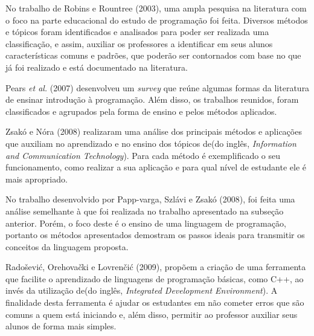 \nocite{doi:10.1076/csed.13.2.137.14200} 
No trabalho de Robins e Rountree (2003), uma ampla pesquisa na literatura com o foco na parte educacional do estudo de programação foi feita. Diversos métodos e tópicos foram identificados e analisados para poder ser realizada uma classificação, e assim, auxiliar os professores a identificar em seus alunos características comuns e padrões, que poderão ser contornados com base no que já foi realizado e está documentado na literatura.

\nocite{Pears:2007:SLT:1345443.1345441}
Pears \textit{et al.} (2007) desenvolveu um \textit{survey} que reúne algumas formas da literatura de ensinar introdução à programação. Além disso, os trabalhos reunidos, foram classificados e agrupados pela forma de ensino e pelos métodos aplicados.


\nocite{teachingapplications} 
Zsakó e Nóra (2008) realizaram uma análise dos principais métodos e aplicações que auxiliam no aprendizado e no ensino dos tópicos de(do inglês, \textit{Information and Communication Technology}). Para cada método é exemplificado o seu funcionamento, como realizar a sua aplicação e para qual nível de estudante ele é mais apropriado. 


\nocite{teachingapplicationslanguages} 
No trabalho desenvolvido por Papp-varga, Szlávi e Zsakó (2008), foi feita uma análise semelhante à que foi realizada no trabalho apresentado na subseção anterior. Porém, o foco deste é o ensino de uma linguagem de programação, portanto os métodos apresentados demostram os passos ideais para transmitir os conceitos da linguagem proposta.

\nocite{newapproach} 
Radošević, Orehovački e Lovrenčić (2009), propõem a criação de uma ferramenta que facilite o aprendizado de linguagens de programação básicas, como C++, ao invés da utilização de(do inglês, \textit{Integrated Development Environment}). A finalidade desta ferramenta é ajudar os estudantes em não cometer erros que são comuns a quem está iniciando e, além disso, permitir ao professor auxiliar seus alunos de forma mais simples.


